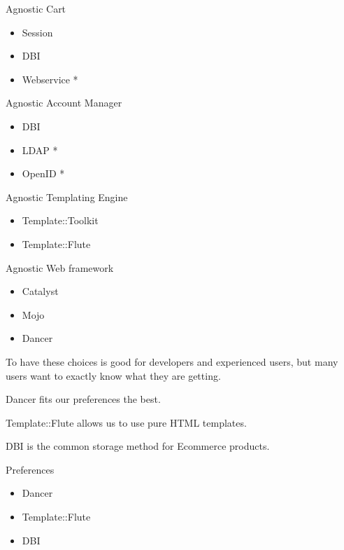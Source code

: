 \begin{frame}{Agnostic}
Cart
\begin{itemize}
\item Session
\item DBI
\item Webservice *
\end{itemize}
\end{frame}

\begin{frame}{Agnostic}
Account Manager
\begin{itemize}
\item DBI
\item LDAP *
\item OpenID *
\end{itemize}
\end{frame}

\begin{frame}{Agnostic}
Templating Engine
\begin{itemize}
\item Template::Toolkit
\item Template::Flute
\end{itemize}
\end{frame}

\begin{frame}{Agnostic}
Web framework
\begin{itemize}
\item Catalyst
\item Mojo
\item Dancer
\end{itemize}
\end{frame}

To have these choices is good for developers and experienced users, 
but many users want to exactly know what they are getting.

Dancer fits our preferences the best.

Template::Flute allows us to use pure HTML templates.

DBI is the common storage method for Ecommerce products.

\begin{frame}{Preferences}
\begin{itemize}
\item Dancer
\item Template::Flute
\item DBI
\end{itemize}
\end{frame}

